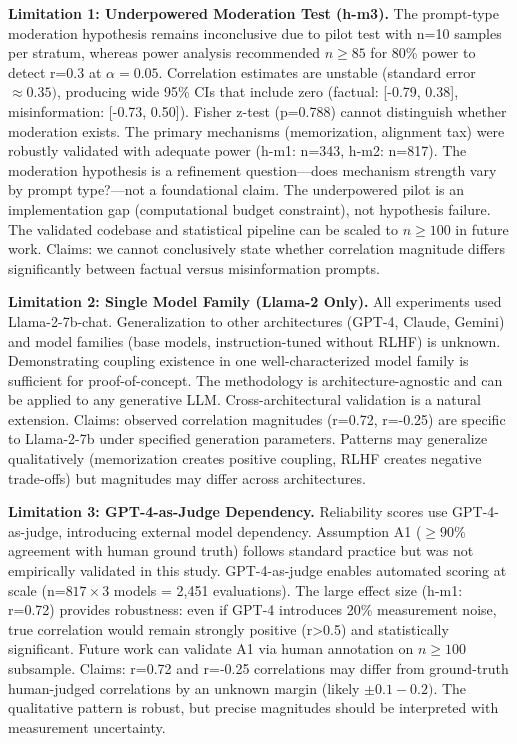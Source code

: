 \textbf{Limitation 1: Underpowered Moderation Test (h-m3).} The prompt-type moderation hypothesis remains inconclusive due to pilot test with n=10 samples per stratum, whereas power analysis recommended $n\geq 85$ for 80\% power to detect r=0.3 at $\alpha =0.05$. Correlation estimates are unstable (standard error $\approx 0.35)$, producing wide 95\% CIs that include zero (factual: [-0.79, 0.38], misinformation: [-0.73, 0.50]). Fisher z-test (p=0.788) cannot distinguish whether moderation exists. The primary mechanisms (memorization, alignment tax) were robustly validated with adequate power (h-m1: n=343, h-m2: n=817). The moderation hypothesis is a refinement question---does mechanism strength vary by prompt type?---not a foundational claim. The underpowered pilot is an implementation gap (computational budget constraint), not hypothesis failure. The validated codebase and statistical pipeline can be scaled to $n\geq 100$ in future work. Claims: we cannot conclusively state whether correlation magnitude differs significantly between factual versus misinformation prompts.

\textbf{Limitation 2: Single Model Family (Llama-2 Only).} All experiments used Llama-2-7b-chat. Generalization to other architectures (GPT-4, Claude, Gemini) and model families (base models, instruction-tuned without RLHF) is unknown. Demonstrating coupling existence in one well-characterized model family is sufficient for proof-of-concept. The methodology is architecture-agnostic and can be applied to any generative LLM. Cross-architectural validation is a natural extension. Claims: observed correlation magnitudes (r=0.72, r=-0.25) are specific to Llama-2-7b under specified generation parameters. Patterns may generalize qualitatively (memorization creates positive coupling, RLHF creates negative trade-offs) but magnitudes may differ across architectures.

\textbf{Limitation 3: GPT-4-as-Judge Dependency.} Reliability scores use GPT-4-as-judge, introducing external model dependency. Assumption A1 ($\geq 90$\% agreement with human ground truth) follows standard practice but was not empirically validated in this study. GPT-4-as-judge enables automated scoring at scale (n=$817\times 3$ models = 2,451 evaluations). The large effect size (h-m1: r=0.72) provides robustness: even if GPT-4 introduces 20\% measurement noise, true correlation would remain strongly positive (r>0.5) and statistically significant. Future work can validate A1 via human annotation on $n\geq 100$ subsample. Claims: r=0.72 and r=-0.25 correlations may differ from ground-truth human-judged correlations by an unknown margin (likely $\pm 0.1-0.2)$. The qualitative pattern is robust, but precise magnitudes should be interpreted with measurement uncertainty.

